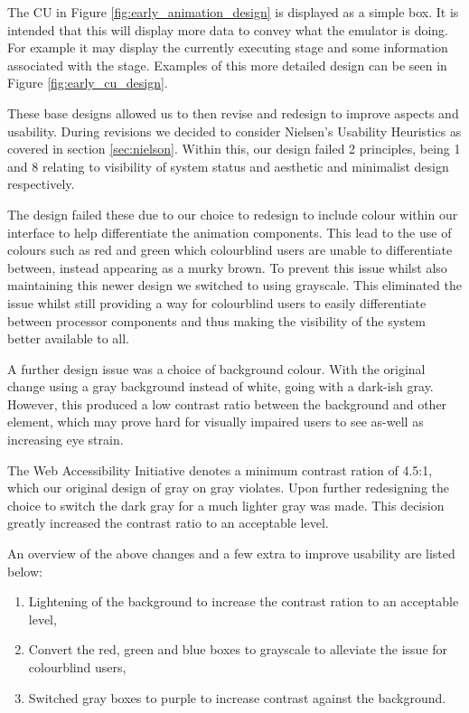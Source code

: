 The \ac{CU} in Figure \ref{fig:early_animation_design} is displayed as a simple box. It is intended that this will display more data to convey what the emulator is doing. For example it may display the currently executing stage and some information associated with the stage. Examples of this more detailed design can be seen in Figure \ref{fig:early_cu_design}.

These base designs allowed us to then revise and redesign to improve aspects and usability. During revisions we decided to consider Nielsen's Usability Heuristics \cite{nielsen_2020_10} as covered in section \ref{sec:nielson}. Within this, our design failed 2 principles, being 1 and 8 relating to visibility of system status and aesthetic and minimalist design respectively.

The design failed these due to our choice to redesign to include colour within our interface to help differentiate the animation components. This lead to the use of colours such as red and green which colourblind users are unable to differentiate between, instead appearing as a murky brown. To prevent this issue whilst also maintaining this newer design we switched to using grayscale. This eliminated the issue whilst still providing a way for colourblind users to easily differentiate between processor components and thus making the visibility of the system better available to all.

A further design issue was a choice of background colour. With the original change using a gray background instead of white, going with a dark-ish gray. However, this produced a low contrast ratio between the background and other element, which may prove hard for visually impaired users to see as-well as increasing eye strain. 

The Web Accessibility Initiative \cite{webaccessibilityinitiativew3_2022_understanding} denotes a minimum contrast ration of 4.5:1, which our original design of gray on gray violates. Upon further redesigning the choice to switch the dark gray for a much lighter gray was made. This decision greatly increased the contrast ratio to an acceptable level.

An overview of the above changes and a few extra to improve usability are listed below:
\begin{enumerate}
    \item Lightening of the background to increase the contrast ration to an acceptable level,
    \item Convert the red, green and blue boxes to grayscale to alleviate the issue for colourblind users,
    \item Switched gray boxes to purple to increase contrast against the background.
\end{enumerate}

